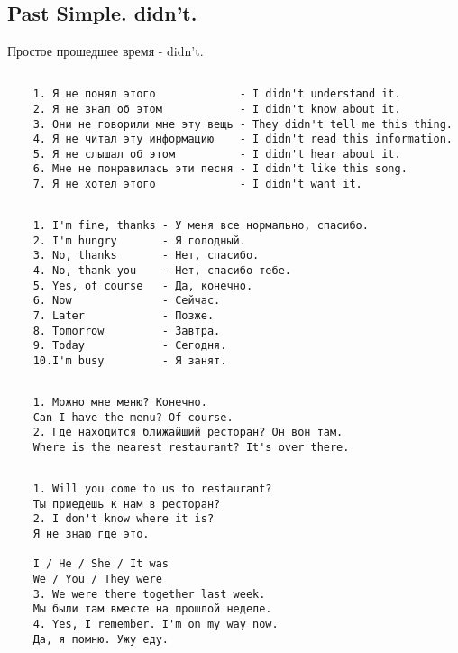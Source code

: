 \subsection{Past Simple. didn't.}
Простое прошедшее время - didn't.
\subsection*{}
\begin{verbatim}
    1. Я не понял этого             - I didn't understand it.
    2. Я не знал об этом            - I didn't know about it.
    3. Они не говорили мне эту вещь - They didn't tell me this thing.
    4. Я не читал эту информацию    - I didn't read this information.
    5. Я не слышал об этом          - I didn't hear about it.
    6. Мне не понравилась эти песня - I didn't like this song.
    7. Я не хотел этого             - I didn't want it.
\end{verbatim}

\subsection*{}
\begin{verbatim}
    1. I'm fine, thanks - У меня все нормально, спасибо.
    2. I'm hungry       - Я голодный.
    3. No, thanks       - Нет, спасибо.
    4. No, thank you    - Нет, спасибо тебе.
    5. Yes, of course   - Да, конечно.
    6. Now              - Сейчас.
    7. Later            - Позже.
    8. Tomorrow         - Завтра.
    9. Today            - Сегодня.
    10.I'm busy         - Я занят.
\end{verbatim}

\subsection*{}
\begin{verbatim}
    1. Можно мне меню? Конечно.
    Can I have the menu? Of course.
    2. Где находится ближайший ресторан? Он вон там.
    Where is the nearest restaurant? It's over there.
\end{verbatim}

\subsection*{}
\begin{verbatim}
    1. Will you come to us to restaurant?
    Ты приедешь к нам в ресторан?
    2. I don't know where it is?
    Я не знаю где это.
    
    I / He / She / It was
    We / You / They were
    3. We were there together last week.
    Мы были там вместе на прошлой неделе.
    4. Yes, I remember. I'm on my way now.
    Да, я помню. Ужу еду.
\end{verbatim}